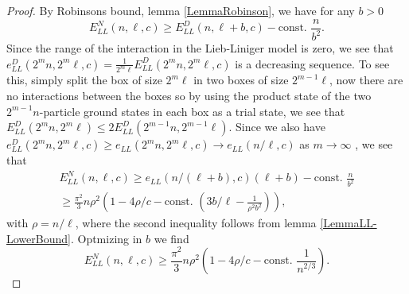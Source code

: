 \documentclass[a4paper,11pt]{article}
\numberwithin{equation}{section}
\begin{document}
	\begin{proof}
		By Robinsons bound, lemma \ref{LemmaRobinson}, we have for any $ b>0 $ \begin{equation}
		E_{LL}^{N}(n,\ell,c)\geq E_{LL}^D(n,\ell+b,c)-\text{const. }\frac{n}{b^2}.
		\end{equation}
		Since the range of the interaction in the Lieb-Liniger model is zero, we see that $ e^D_{LL}(2^mn,2^m\ell,c)=\frac{1}{2^m\ell}E_{LL}^{D}(2^mn,2^m\ell,c) $ is a decreasing sequence. To see this, simply split the box of size $ 2^m\ell $ in two boxes of size $ 2^{m-1}\ell $, now there are no interactions between the boxes so by using the product state of the two $ 2^{m-1}n $-particle ground states in each box as a trial state, we see that $ E^D_{LL}(2^{m}n,2^m\ell)\leq 2E^D_{LL}(2^{m-1}n,2^{m-1}\ell)  $. Since we also have $ e^D_{LL}(2^mn,2^m\ell,c)\geq e_{LL}(2^mn,2^m\ell,c)\to e_{LL}(n/\ell,c) $ as $ m\to\infty $ \cite{PhysRev.130.1605}, we see that \begin{equation}
		\begin{aligned}
		E_{LL}^{N}(n,\ell,c)\geq e_{LL}(n/(\ell+b),c)(\ell+b)-\text{const. }\frac{n}{b^2}\\\geq \frac{\pi^2}{3}n\rho^2\left(1-4\rho/c-\text{const. }\left(3b/\ell-\frac{1}{\rho^2b^2}\right)\right),
		\end{aligned}
		\end{equation}
		with $ \rho=n/\ell $, where the second inequality follows from lemma \ref{LemmaLL-LowerBound}. Optmizing in $ b $ we find \begin{equation}
		E_{LL}^{N}(n,\ell,c)\geq \frac{\pi^2}{3}n\rho^2\left(1-4\rho/c-\text{const. }\frac{1}{n^{2/3}}\right).
		\end{equation}
	\end{proof}
\end{document}
